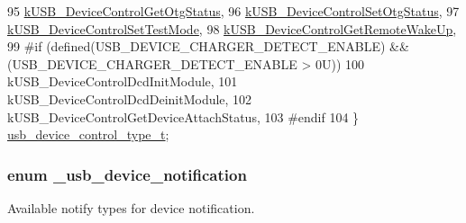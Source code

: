 \begin{DoxyCode}
95     \hyperlink{group__usb__device__controller__driver_ggaa7a58da69289c9e774119a7998835c54a47e409659c5b7c11a8aa26ad4ec65279}{kUSB\_DeviceControlGetOtgStatus},      
96     \hyperlink{group__usb__device__controller__driver_ggaa7a58da69289c9e774119a7998835c54a9b5a35a9f0054382e96410fffb7f2e8b}{kUSB\_DeviceControlSetOtgStatus},      
97     \hyperlink{group__usb__device__controller__driver_ggaa7a58da69289c9e774119a7998835c54ad3c6f680a4c3f112607d3a582b8b2cd8}{kUSB\_DeviceControlSetTestMode},       
98     \hyperlink{group__usb__device__controller__driver_ggaa7a58da69289c9e774119a7998835c54a268bbf4bd031a441273508f75d24ddc4}{kUSB\_DeviceControlGetRemoteWakeUp},   
99 \textcolor{preprocessor}{#if (defined(USB\_DEVICE\_CHARGER\_DETECT\_ENABLE) && (USB\_DEVICE\_CHARGER\_DETECT\_ENABLE > 0U))
}
100 \textcolor{preprocessor}{}    kUSB\_DeviceControlDcdInitModule,
101     kUSB\_DeviceControlDcdDeinitModule,
102     kUSB\_DeviceControlGetDeviceAttachStatus,
103 \textcolor{preprocessor}{#endif
}
104 \textcolor{preprocessor}{}\} \hyperlink{group__usb__device__controller__driver_gae16dc18943ae9da34a2b122859568b5e}{usb\_device\_control\_type\_t};
\end{DoxyCode}
\hypertarget{group__usb__device__controller__driver_gafdba1a6b57efd437d6a941bfbb9239db}{
\subsubsection[{\-\_\-usb\-\_\-device\-\_\-notification}]{\setlength{\rightskip}{0pt plus 5cm}enum {\bf \-\_\-usb\-\_\-device\-\_\-notification}}}\label{group__usb__device__controller__driver_gafdba1a6b57efd437d6a941bfbb9239db}


Available notify types for device notification. 

